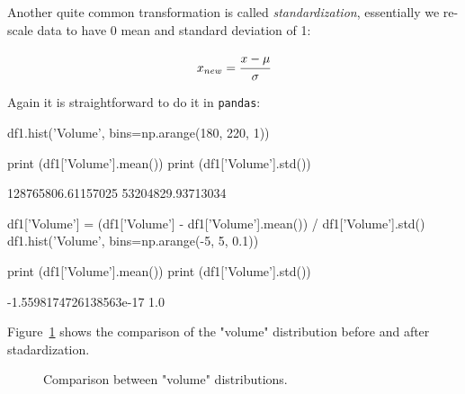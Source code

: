 Another quite common transformation is called \emph{standardization}, essentially we re-scale data to have 0 mean and standard deviation of 1:

\begin{equation}
x_{new} = \cfrac{x-\mu}{\sigma}
\label{eq:standardization}
\end{equation}

Again it is straightforward to do it in \texttt{pandas}:

\begin{ipython}
df1.hist('Volume', bins=np.arange(180, 220, 1))

print (df1['Volume'].mean())
print (df1['Volume'].std())
\end{ipython}
\begin{ioutput}
128765806.61157025
53204829.93713034
\end{ioutput}

\begin{ipython}
df1['Volume'] = (df1['Volume'] - df1['Volume'].mean()) / df1['Volume'].std()
df1.hist('Volume', bins=np.arange(-5, 5, 0.1))

print (df1['Volume'].mean())
print (df1['Volume'].std())
\end{ipython}
\begin{ioutput}
-1.5598174726138563e-17
1.0
\end{ioutput}

Figure~\ref{fig:standardization} shows the comparison of the "volume" distribution before and after stadardization.

\begin{figure}[htb]
	\centering
	\caption{Comparison between "volume" distributions.}
	\label{fig:standardization}
\end{figure}

